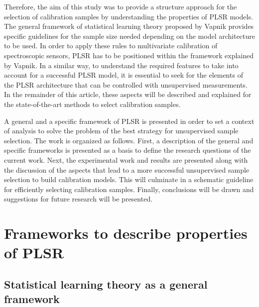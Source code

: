 \documentclass[journal=ancham,manuscript=article]{achemso}
\begin{document}
Therefore, the aim of this study was to provide a structure approach for the selection of calibration samples by understanding the properties of PLSR models. The general framework of statistical learning theory proposed by Vapnik provides specific guidelines for the sample size needed depending on the model architecture to be used\cite{Vapnik2019, Vapnik2000}. In order to apply these rules to multivariate calibration of spectroscopic sensors, PLSR has to be positioned within the framework explained by Vapnik. In a similar way, to understand the required features to take into account for a successful PLSR model, it is essential to seek for the elements of the PLSR architecture that can be controlled with unsupervised measurements. In the remainder of this article, these aspects will be described and explained for the state-of-the-art methods to select calibration samples.

A general and a specific framework of PLSR is presented in order to set a context of analysis to solve the problem of the best strategy for unsupervised sample selection. The work is organized as follows. First, a description of the general and specific frameworks is presented as a basis to define the research questions of the current work. Next, the experimental work and results are presented along with the discussion of the aspects that lead to a more successful unsupervised sample selection to build calibration models. This will culminate in a schematic guideline for efficiently selecting calibration samples. Finally, conclusions will be drawn and suggestions for future research will be presented.


\section{Frameworks to describe properties of PLSR}

\subsection{Statistical learning theory as a general framework}
\end{document}
